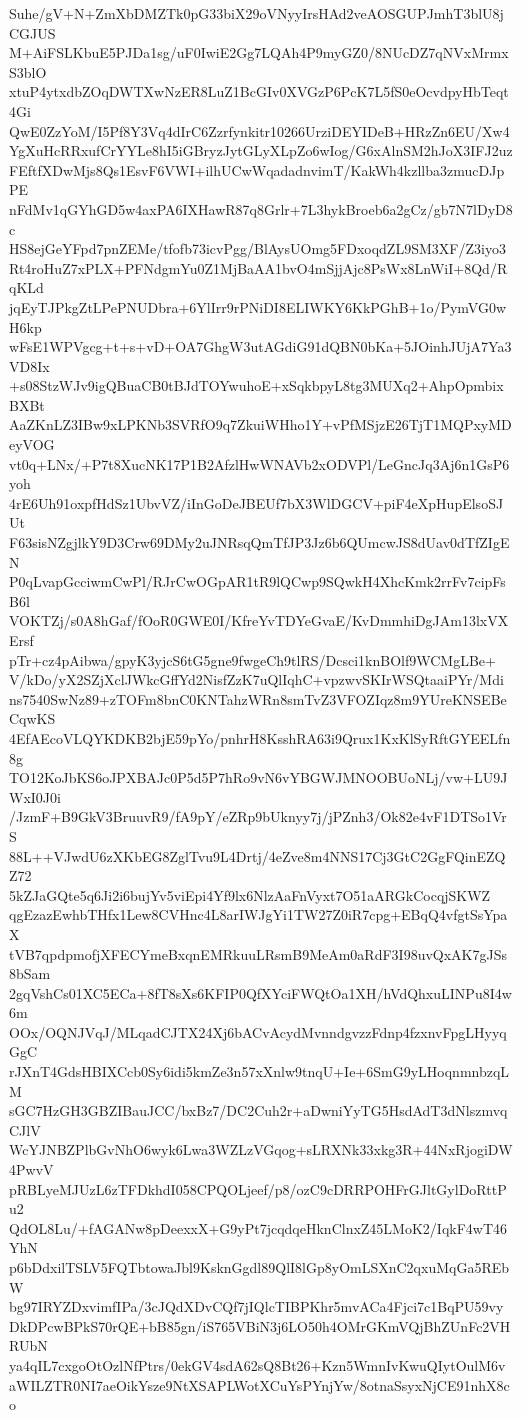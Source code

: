 Suhe/gV+N+ZmXbDMZTk0pG33biX29oVNyyIrsHAd2veAOSGUPJmhT3blU8jCGJUS
M+AiFSLKbuE5PJDa1sg/uF0IwiE2Gg7LQAh4P9myGZ0/8NUcDZ7qNVxMrmxS3blO
xtuP4ytxdbZOqDWTXwNzER8LuZ1BcGIv0XVGzP6PcK7L5fS0eOcvdpyHbTeqt4Gi
QwE0ZzYoM/I5Pf8Y3Vq4dIrC6Zzrfynkitr10266UrziDEYIDeB+HRzZn6EU/Xw4
YgXuHcRRxufCrYYLe8hI5iGBryzJytGLyXLpZo6wIog/G6xAlnSM2hJoX3IFJ2uz
FEftfXDwMjs8Qs1EsvF6VWI+ilhUCwWqadadnvimT/KakWh4kzllba3zmucDJpPE
nFdMv1qGYhGD5w4axPA6IXHawR87q8Grlr+7L3hykBroeb6a2gCz/gb7N7lDyD8c
HS8ejGeYFpd7pnZEMe/tfofb73icvPgg/BlAysUOmg5FDxoqdZL9SM3XF/Z3iyo3
Rt4roHuZ7xPLX+PFNdgmYu0Z1MjBaAA1bvO4mSjjAjc8PsWx8LnWiI+8Qd/RqKLd
jqEyTJPkgZtLPePNUDbra+6YlIrr9rPNiDI8ELIWKY6KkPGhB+1o/PymVG0wH6kp
wFsE1WPVgcg+t+s+vD+OA7GhgW3utAGdiG91dQBN0bKa+5JOinhJUjA7Ya3VD8Ix
+s08StzWJv9igQBuaCB0tBJdTOYwuhoE+xSqkbpyL8tg3MUXq2+AhpOpmbixBXBt
AaZKnLZ3IBw9xLPKNb3SVRfO9q7ZkuiWHho1Y+vPfMSjzE26TjT1MQPxyMDeyVOG
vt0q+LNx/+P7t8XucNK17P1B2AfzlHwWNAVb2xODVPl/LeGncJq3Aj6n1GsP6yoh
4rE6Uh91oxpfHdSz1UbvVZ/iInGoDeJBEUf7bX3WlDGCV+piF4eXpHupElsoSJUt
F63sisNZgjlkY9D3Crw69DMy2uJNRsqQmTfJP3Jz6b6QUmcwJS8dUav0dTfZIgEN
P0qLvapGcciwmCwPl/RJrCwOGpAR1tR9lQCwp9SQwkH4XhcKmk2rrFv7cipFsB6l
VOKTZj/s0A8hGaf/fOoR0GWE0I/KfreYvTDYeGvaE/KvDmmhiDgJAm13lxVXErsf
pTr+cz4pAibwa/gpyK3yjcS6tG5gne9fwgeCh9tlRS/Dcsci1knBOlf9WCMgLBe+
V/kDo/yX2SZjXclJWkcGffYd2NisfZzK7uQlIqhC+vpzwvSKIrWSQtaaiPYr/Mdi
ns7540SwNz89+zTOFm8bnC0KNTahzWRn8smTvZ3VFOZIqz8m9YUreKNSEBeCqwKS
4EfAEcoVLQYKDKB2bjE59pYo/pnhrH8KsshRA63i9Qrux1KxKlSyRftGYEELfn8g
TO12KoJbKS6oJPXBAJc0P5d5P7hRo9vN6vYBGWJMNOOBUoNLj/vw+LU9JWxI0J0i
/JzmF+B9GkV3BruuvR9/fA9pY/eZRp9bUknyy7j/jPZnh3/Ok82e4vF1DTSo1VrS
88L++VJwdU6zXKbEG8ZglTvu9L4Drtj/4eZve8m4NNS17Cj3GtC2GgFQinEZQZ72
5kZJaGQte5q6Ji2i6bujYv5viEpi4Yf9lx6NlzAaFnVyxt7O51aARGkCocqjSKWZ
qgEzazEwhbTHfx1Lew8CVHnc4L8arIWJgYi1TW27Z0iR7cpg+EBqQ4vfgtSsYpaX
tVB7qpdpmofjXFECYmeBxqnEMRkuuLRsmB9MeAm0aRdF3I98uvQxAK7gJSs8bSam
2gqVshCs01XC5ECa+8fT8sXs6KFIP0QfXYciFWQtOa1XH/hVdQhxuLINPu8I4w6m
OOx/OQNJVqJ/MLqadCJTX24Xj6bACvAcydMvnndgvzzFdnp4fzxnvFpgLHyyqGgC
rJXnT4GdsHBIXCcb0Sy6idi5kmZe3n57xXnlw9tnqU+Ie+6SmG9yLHoqnmnbzqLM
sGC7HzGH3GBZIBauJCC/bxBz7/DC2Cuh2r+aDwniYyTG5HsdAdT3dNlszmvqCJlV
WcYJNBZPlbGvNhO6wyk6Lwa3WZLzVGqog+sLRXNk33xkg3R+44NxRjogiDW4PwvV
pRBLyeMJUzL6zTFDkhdI058CPQOLjeef/p8/ozC9cDRRPOHFrGJltGylDoRttPu2
QdOL8Lu/+fAGANw8pDeexxX+G9yPt7jcqdqeHknClnxZ45LMoK2/IqkF4wT46YhN
p6bDdxilTSLV5FQTbtowaJbl9KsknGgdl89QlI8lGp8yOmLSXnC2qxuMqGa5REbW
bg97IRYZDxvimfIPa/3cJQdXDvCQf7jIQlcTIBPKhr5mvACa4Fjci7c1BqPU59vy
DkDPcwBPkS70rQE+bB85gn/iS765VBiN3j6LO50h4OMrGKmVQjBhZUnFc2VHRUbN
ya4qIL7cxgoOtOzlNfPtrs/0ekGV4sdA62sQ8Bt26+Kzn5WmnIvKwuQIytOulM6v
aWILZTR0NI7aeOikYsze9NtXSAPLWotXCuYsPYnjYw/8otnaSsyxNjCE91nhX8co
